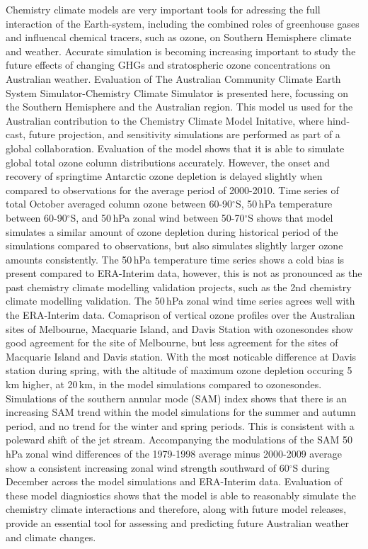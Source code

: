 Chemistry climate models are very important tools for adressing the full interaction of the Earth-system, including the combined roles of greenhouse gases and influencal chemical tracers, such as ozone, on Southern Hemisphere climate and weather. Accurate simulation is becoming increasing important to study the future effects of changing GHGs and stratospheric ozone concentrations on Australian weather. Evaluation of The Australian Community Climate Earth System Simulator-Chemistry Climate Simulator is presented here, focussing on the Southern Hemisphere and the Australian region. This model us used for the Australian contribution to the Chemistry Climate Model Initative, where hind-cast, future projection, and sensitivity simulations are performed as part of a global collaboration. Evaluation of the model shows that it is able to simulate global total ozone column distributions accurately. However, the onset and recovery of springtime Antarctic ozone depletion is delayed slightly when compared to observations for the average period of 2000-2010. Time series of total October averaged column ozone between 60-90$^\circ$S, 50\,hPa temperature between 60-90$^\circ$S, and 50\,hPa zonal wind between 50-70$^\circ$S shows that model simulates a similar amount of ozone depletion during historical period of the simulations compared to observations, but also simulates slightly larger ozone amounts consistently. The 50\,hPa temperature time series shows a cold bias is present compared to ERA-Interim data, however, this is not as pronounced as the past chemistry climate modelling validation projects, such as the 2nd chemistry climate modelling validation. The 50\,hPa zonal wind time series agrees well with the ERA-Interim data. Comaprison of vertical ozone profiles over the Australian sites of Melbourne, Macquarie Island, and Davis Station with ozonesondes show good agreement for the site of Melbourne, but less agreement for the sites of Macquarie Island and Davis station. With the most noticable difference at Davis station during spring, with the altitude of maximum ozone depletion occuring 5\,km higher, at 20\,km, in the model simulations compared to ozonesondes. Simulations of the southern annular mode (SAM) index shows that there is an increasing SAM trend within the model simulations for the summer and autumn period, and no trend for the winter and spring periods. This is consistent with a poleward shift of the jet stream. Accompanying the modulations of the SAM 50\,hPa zonal wind differences of the 1979-1998 average minus 2000-2009 average show a consistent increasing zonal wind strength southward of 60$^\circ$S during December across the model simulations and ERA-Interim data. Evaluation of these model diagniostics shows that the model is able to reasonably simulate the chemistry climate interactions and therefore, along with future model releases, provide an essential tool for assessing and predicting future Australian weather and climate changes.
